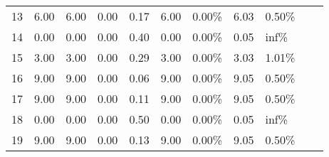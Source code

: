 \begin{frame}
\begin{tabular}{lllrrrlllll}
    13 & 6.00                 & 6.00                   & 0.00                    & 0.17 & 6.00  & 0.00\% & 6.03 & 0.50\% \\
    14 & 0.00                 & 0.00                   & 0.00                    & 0.40 & 0.00  & 0.00\% & 0.05 & inf\%  \\
    15 & 3.00                 & 3.00                   & 0.00                    & 0.29 & 3.00  & 0.00\% & 3.03 & 1.01\% \\
    16 & 9.00                 & 9.00                   & 0.00                    & 0.06 & 9.00  & 0.00\% & 9.05 & 0.50\% \\
    17 & 9.00                 & 9.00                   & 0.00                    & 0.11 & 9.00  & 0.00\% & 9.05 & 0.50\% \\
    18 & 0.00                 & 0.00                   & 0.00                    & 0.50 & 0.00  & 0.00\% & 0.05 & inf\%  \\
    19 & 9.00                 & 9.00                   & 0.00                    & 0.13 & 9.00  & 0.00\% & 9.05 & 0.50\% \\
    \bottomrule
  \end{tabular}
  \normalsize
\end{frame}

